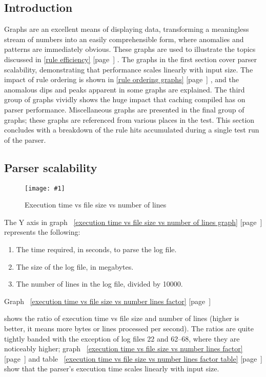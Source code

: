\documentclass[a4paper,12pt,draft]{article}
\newcommand{\showgraph}[3]{
    \begin{figure}[hbt!]
        \caption{#2}\label{#3}
        \texttt{[image: \#1]}
    \end{figure}
}
\newcommand{\refwithpage}[1]{%
    \empty{}\ref{#1} [page~\pageref{#1}]%
}
\newcommand{\sectionref}[1]{%
    \textsection{}\refwithpage{#1}%
}
\begin{document}
\renewcommand{\figurename}{Graph}

\subsection{Introduction}

Graphs are an excellent means of displaying data, transforming a
meaningless stream of numbers into an easily comprehensible form, where
anomalies and patterns are immediately obvious.  These graphs are used to
illustrate the topics discussed in \sectionref{rule efficiency}.  The
graphs in the first section cover parser scalability, demonstrating that
performance scales linearly with input size.  The impact of rule ordering
is shown in \sectionref{rule ordering graphs}, and the anomalous dips and
peaks apparent in some graphs are explained.  The third group of graphs
vividly shows the huge impact that caching compiled \regexes{} has on
parser performance.  Miscellaneous graphs are presented in the final group
of graphs; these graphs are referenced from various places in the test.
This section concludes with a breakdown of the rule hits accumulated during
a single test run of the parser.

\subsection{Parser scalability}

\showgraph{build/plot-normal-filesize-numlines}{Execution time vs file
size vs number of lines}{execution time vs file size vs number of lines
graph}

The Y axis in graph~\refwithpage{execution time vs file size vs number of
lines graph} represents the following:

\begin{enumerate}

    \item The time required, in seconds, to parse the log file.

    \item The size of the log file, in megabytes.

    \item The number of lines in the log file, divided by 10000.

\end{enumerate}

Graph~\refwithpage{execution time vs file size vs number lines factor}
shows the ratio of execution time vs file size and number of lines (higher
is better, it means more bytes or lines processed per second).  The ratios
are quite tightly banded with the exception of log files 22 and 62--68,
where they are noticeably higher; graph~\refwithpage{execution time vs file
size vs number lines factor} and table~\refwithpage{execution time vs file
size vs number lines factor table} show that the parser's execution time
scales linearly with input size.
\end{document}

